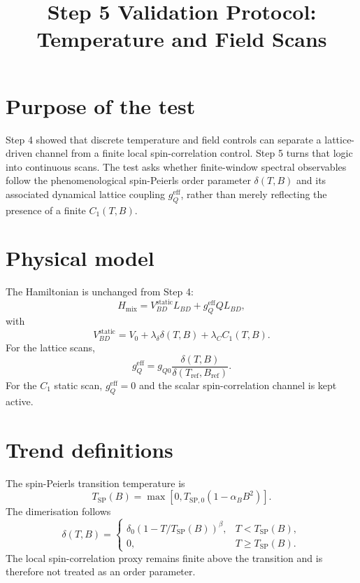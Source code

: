 \documentclass[11pt]{article}
\title{Step 5 Validation Protocol: Temperature and Field Scans}
\author{}
\date{}
\begin{document}
\maketitle

\section{Purpose of the test}
Step 4 showed that discrete temperature and field controls can separate a
lattice-driven channel from a finite local spin-correlation control.  Step 5
turns that logic into continuous scans.  The test asks whether finite-window
spectral observables follow the phenomenological spin-Peierls order parameter
$\delta(T,B)$ and its associated dynamical lattice coupling
$g_Q^{\mathrm{eff}}$, rather than merely reflecting the presence of a finite
$C_1(T,B)$.

\section{Physical model}
The Hamiltonian is unchanged from Step 4:
\begin{equation}
H_{\mathrm{mix}} =
V_{BD}^{\mathrm{static}} L_{BD}
+ g_Q^{\mathrm{eff}} Q L_{BD},
\end{equation}
with
\begin{equation}
V_{BD}^{\mathrm{static}} =
V_0 + \lambda_\delta \delta(T,B) + \lambda_C C_1(T,B).
\end{equation}
For the lattice scans,
\begin{equation}
g_Q^{\mathrm{eff}} = g_{Q0}
\frac{\delta(T,B)}{\delta(T_{\mathrm{ref}},B_{\mathrm{ref}})}.
\end{equation}
For the $C_1$ static scan, $g_Q^{\mathrm{eff}}=0$ and the scalar
spin-correlation channel is kept active.

\section{Trend definitions}
The spin-Peierls transition temperature is
\begin{equation}
T_{\mathrm{SP}}(B)=
\max\left[0,T_{\mathrm{SP},0}(1-\alpha_B B^2)\right].
\end{equation}
The dimerisation follows
\begin{equation}
\delta(T,B)=
\begin{cases}
\delta_0\left(1-T/T_{\mathrm{SP}}(B)\right)^\beta,
& T<T_{\mathrm{SP}}(B),\\
0, & T\ge T_{\mathrm{SP}}(B).
\end{cases}
\end{equation}
The local spin-correlation proxy remains finite above the transition and is
therefore not treated as an order parameter.
\end{document}
